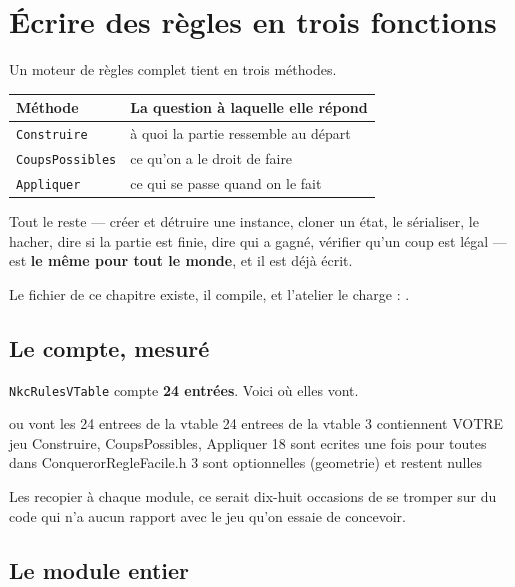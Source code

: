 \chapter{Écrire des règles en trois fonctions}

Un moteur de règles complet tient en trois méthodes.

\begin{center}
\begin{tabular}{@{}p{3.6cm}p{9.8cm}@{}}
\toprule
\textbf{Méthode} & \textbf{La question à laquelle elle répond} \\
\midrule
\texttt{Construire} & à quoi la partie ressemble au départ \\
\texttt{CoupsPossibles} & ce qu'on a le droit de faire \\
\texttt{Appliquer} & ce qui se passe quand on le fait \\
\bottomrule
\end{tabular}
\end{center}

Tout le reste --- créer et détruire une instance, cloner un état, le sérialiser,
le hacher, dire si la partie est finie, dire qui a gagné, vérifier qu'un coup est
légal --- est \textbf{le même pour tout le monde}, et il est déjà écrit.

Le fichier de ce chapitre existe, il compile, et l'atelier le charge :
.

\section{Le compte, mesuré}

\texttt{NkcRulesVTable} compte \textbf{24 entrées}. Voici où elles vont.

\begin{nkcode}{ou vont les 24 entrees de la vtable}
24  entrees de la vtable
 3  contiennent VOTRE jeu    Construire, CoupsPossibles, Appliquer
18  sont ecrites une fois pour toutes dans ConquerorRegleFacile.h
 3  sont optionnelles (geometrie) et restent nulles
\end{nkcode}

Les recopier à chaque module, ce serait dix-huit occasions de se tromper sur du
code qui n'a aucun rapport avec le jeu qu'on essaie de concevoir.

\section{Le module entier}


